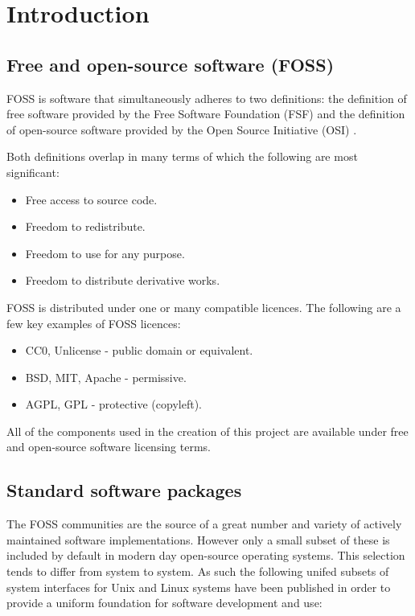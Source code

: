 \section{Introduction}\label{Introduction}

\subsection{Free and open-source software (FOSS)}

FOSS is software that simultaneously adheres to two definitions: the definition of free software provided by the Free Software Foundation (FSF) \cite{fsf} and the definition of open-source software provided by the Open Source Initiative (OSI) \cite{osi}.

Both definitions overlap in many terms of which the following are most significant:

\begin{itemize}
    \item Free access to source code.
    \item Freedom to redistribute.
    \item Freedom to use for any purpose.
    \item Freedom to distribute derivative works.
\end{itemize}

FOSS is distributed under one or many compatible licences. The following are a few key examples of FOSS licences:

\begin{itemize}
    \item CC0, Unlicense - public domain or equivalent.
    \item BSD, MIT, Apache - permissive.
    \item AGPL, GPL - protective (copyleft).
\end{itemize}

All of the components used in the creation of this project are available under free and open-source software licensing terms.

\subsection{Standard software packages}

The FOSS communities are the source of a great number and variety of actively maintained software implementations. However only a small subset of these is included by default in modern day open-source operating systems. This selection tends to differ from system to system. As such the following unifed subsets of system interfaces for Unix and Linux systems have been published in order to provide a uniform foundation for software development and use:


